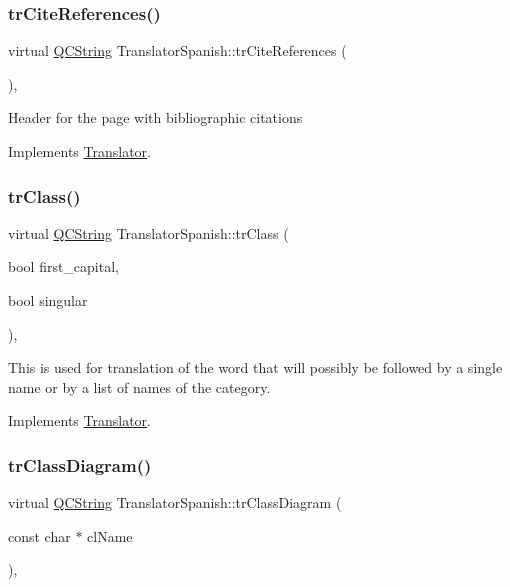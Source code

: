 \subsubsection{\texorpdfstring{trCiteReferences()}{trCiteReferences()}}
{\footnotesize\ttfamily virtual \mbox{\hyperlink{class_q_c_string}{Q\+C\+String}} Translator\+Spanish\+::tr\+Cite\+References (\begin{DoxyParamCaption}{ }\end{DoxyParamCaption})\hspace{0.3cm}{\ttfamily [inline]}, {\ttfamily [virtual]}}

Header for the page with bibliographic citations 

Implements \mbox{\hyperlink{class_translator}{Translator}}.

\mbox{\label{class_translator_spanish_a29f8eec5f7a204c79471f3ebdf25df22}} 
\subsubsection{\texorpdfstring{trClass()}{trClass()}}
{\footnotesize\ttfamily virtual \mbox{\hyperlink{class_q_c_string}{Q\+C\+String}} Translator\+Spanish\+::tr\+Class (\begin{DoxyParamCaption}\item[{bool}]{first\+\_\+capital,  }\item[{bool}]{singular }\end{DoxyParamCaption})\hspace{0.3cm}{\ttfamily [inline]}, {\ttfamily [virtual]}}

This is used for translation of the word that will possibly be followed by a single name or by a list of names of the category. 

Implements \mbox{\hyperlink{class_translator}{Translator}}.

\mbox{\label{class_translator_spanish_ac510788c5bf0c2566ed8e37c7c6dba0f}} 
\subsubsection{\texorpdfstring{trClassDiagram()}{trClassDiagram()}}
{\footnotesize\ttfamily virtual \mbox{\hyperlink{class_q_c_string}{Q\+C\+String}} Translator\+Spanish\+::tr\+Class\+Diagram (\begin{DoxyParamCaption}\item[{const char $\ast$}]{cl\+Name }\end{DoxyParamCaption})\hspace{0.3cm}{\ttfamily [inline]}, {\ttfamily [virtual]}}

